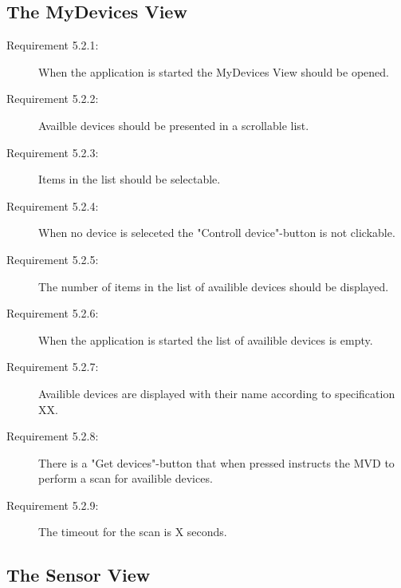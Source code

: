 \documentclass[a4paper]{article}
\begin{document}
\subsection{The MyDevices View}
\begin{description}
\item[Requirement 5.2.1:] When the application is started the MyDevices View should be opened.

\item[Requirement 5.2.2:] Availble devices should be presented in a scrollable list.

\item[Requirement 5.2.3:] Items in the list should be selectable.

\item[Requirement 5.2.4:] When no device is seleceted the "Controll device"-button is not clickable. 

\item[Requirement 5.2.5:] The number of items in the list of availible devices should be displayed.

\item[Requirement 5.2.6:] When the application is started the list of availible devices is empty.

\item[Requirement 5.2.7:] Availible devices are displayed with their name according to specification XX.

\item[Requirement 5.2.8:] There is a "Get devices"-button that when pressed instructs the MVD to perform a scan for availible devices.

\item[Requirement 5.2.9:] The timeout for the scan is X seconds. 

\end{description}

\subsection{The Sensor View}
\end{document}
